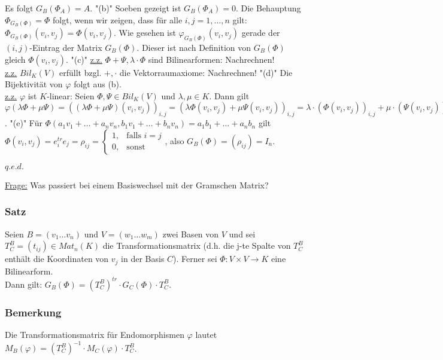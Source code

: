 \documentclass[a4paper]{article}
\newcommand{\ul}{\underline}
\renewcommand{\qed}{\begin{flushright}
\ul{\(q.e.d.\)}
\end{flushright}}
\let\phi\varphi
\begin{document}
Es folgt \(G_B(\Phi_A)=A\).
"(b)" Soeben gezeigt ist \(G_B(\Phi_A)=0\). Die Behauptung \(\Phi_{G_B(\Phi)}=\Phi\) folgt, wenn wir zeigen, dass für alle \(i,j=1,\dots,n\) gilt:\(\Phi_{G_B(\Phi)}(v_i,v_j)=\Phi(v_i,v_j)\). Wie gesehen ist \(\phi_{G_B(\Phi)}(v_i,v_j)\) gerade der \((i,j)\)-Eintrag der Matrix \(G_B(\Phi)\). Dieser ist nach Definition von \(G_B(\Phi)\) gleich \(\Phi(v_i,v_j)\).
"(c)" \ul{z.z.} \(\Phi+\Psi,\lambda\cdot\Phi\) sind Bilinearformen: Nachrechnen!\\
\ul{z.z.} \(Bil_K(V)\) erfüllt bzgl. \(+,\cdot\) die Vektorraumaxiome: Nachrechnen!
"(d)" Die Bijektivität von \(\phi\) folgt aus (b).\\
\ul{z.z.} \(\phi\) ist \(K\)-linear: Seien \(\Phi,\Psi\in Bil_K(V)\) und \(\lambda,\mu\in K\). Dann gilt \(\phi(\lambda\Phi+\mu\Psi)=((\lambda\Phi+\mu\Psi)(v_i,v_j))_{i,j}=(\lambda\Phi(v_i,v_j)+\mu\Psi(v_i,v_j))_{i,j}=\lambda\cdot(\Phi(v_i,v_j))_{i,j}+\mu\cdot(\Psi(v_i,v_j))_{i,j}=\lambda\phi(\Phi)+\mu\phi(\Psi)\).
"(e)" Für \(\Phi(a_1v_1+\dots+a_nv_n,b_1v_1+\dots+b_nv_n)=a_1b_1+\dots+a_nb_n\) gilt \(\Phi(v_i,v_j)=e_i^{tr}e_j=\rho_{ij}=\begin{cases}
1,& \text{falls }i=j\\
0,& \text{sonst}
\end{cases}\), also \(G_B(\Phi)=(\rho_{ij})=I_n\).
\qed
\ul{Frage:} Was passiert bei einem Basiswechsel mit der Gramschen Matrix?
\subsubsection{Satz}
Seien \(B=(v_1 \dots v_n)\) und \(V=(w_1 \dots w_m)\) zwei Basen von \(V\) und sei \(T_C^B=(t_{ij})\in Mat_n(K)\) die Transformationsmatrix (d.h. die j-te Spalte von \(T_C^B\) enthält die Koordinaten von \(v_j\) in der Basis \(C\)). Ferner sei \(\Phi:V\times V\rightarrow K\) eine Bilinearform.\\
Dann gilt: \(G_B(\Phi)=(T_C^B)^{tr}\cdot G_C(\Phi)\cdot T_C^B\).
\subsubsection{Bemerkung}
Die Transformationsmatrix für Endomorphismen \(\phi\) lautet \(M_B(\phi)=(T_C^B)^{-1}\cdot M_C(\phi)\cdot T_C^B\).
\end{document}
